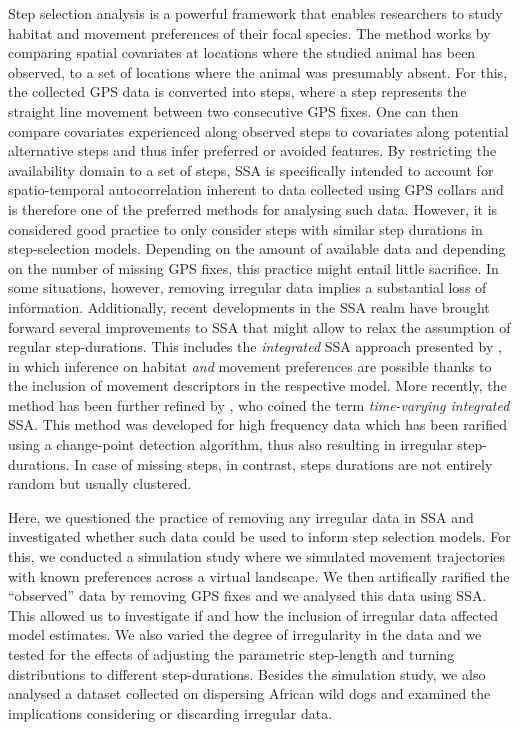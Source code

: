 \documentclass[abstract=on,10pt,a4paper,bibliography=totocnumbered]{article}
\begin{document}
Step selection analysis is a powerful framework that enables researchers to
study habitat and movement preferences of their focal species. The method works
by comparing spatial covariates at locations where the studied animal has been
observed, to a set of locations where the animal was presumably absent. For
this, the collected GPS data is converted into steps, where a step represents
the straight line movement between two consecutive GPS fixes. One can then
compare covariates experienced along observed steps to covariates along
potential alternative steps and thus infer preferred or avoided features. By
restricting the availability domain to a set of steps, SSA is specifically
intended to account for spatio-temporal autocorrelation inherent to data
collected using GPS collars and is therefore one of the preferred methods for
analysing such data. However, it is considered good practice to only consider
steps with similar step durations in step-selection models. Depending on the
amount of available data and depending on the number of missing GPS fixes, this
practice might entail little sacrifice. In some situations, however, removing
irregular data implies a substantial loss of information. Additionally, recent
developments in the SSA realm have brought forward several improvements to SSA
that might allow to relax the assumption of regular step-durations. This
includes the \textit{integrated} SSA approach presented by \citep{Avgar.2016},
in which inference on habitat \textit{and} movement preferences are possible
thanks to the inclusion of movement descriptors in the respective model. More
recently, the method has been further refined by \citep{Munden.2021}, who coined
the term \textit{time-varying integrated} SSA. This method was developed for
high frequency data which has been rarified using a change-point detection
algorithm, thus also resulting in irregular step-durations. In case of missing
steps, in contrast, steps durations are not entirely random but usually
clustered.

Here, we questioned the practice of removing any irregular data in SSA and
investigated whether such data could be used to inform step selection models.
For this, we conducted a simulation study where we simulated movement
trajectories with known preferences across a virtual landscape. We then
artifically rarified the ``observed'' data by removing GPS fixes and we analysed
this data using SSA. This allowed us to investigate if and how the inclusion of
irregular data affected model estimates. We also varied the degree of
irregularity in the data and we tested for the effects of adjusting the
parametric step-length and turning distributions to different step-durations.
Besides the simulation study, we also analysed a dataset collected on dispersing
African wild dogs and examined the implications considering or discarding
irregular data.
\end{document}
